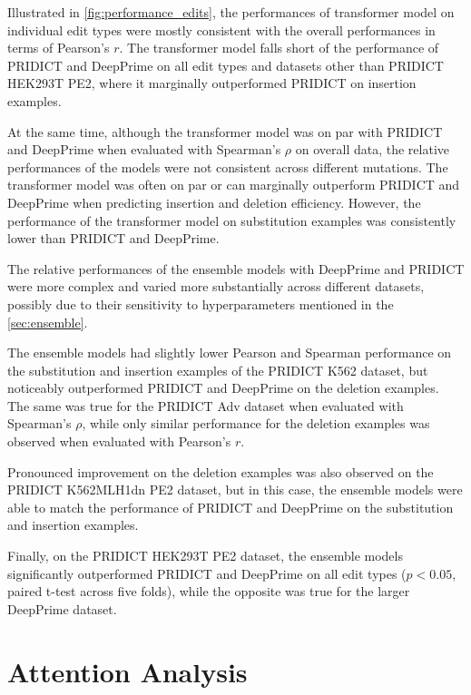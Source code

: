 Illustrated in \autoref{fig:performance_edits}, the performances of transformer model on individual edit types were mostly consistent with the overall performances in terms of Pearson's $r$. The transformer model falls short of the performance of PRIDICT and DeepPrime on all edit types and datasets other than PRIDICT HEK293T PE2, where it marginally outperformed PRIDICT on insertion examples.

At the same time, although the transformer model was on par with PRIDICT and DeepPrime when evaluated with Spearman's $\rho$ on overall data, the relative performances of the models were not consistent across different mutations. The transformer model was often on par or can marginally outperform PRIDICT and DeepPrime when predicting insertion and deletion efficiency. However, the performance of the transformer model on substitution examples was consistently lower than PRIDICT and DeepPrime.

The relative performances of the ensemble models with DeepPrime and PRIDICT were more complex and varied more substantially across different datasets, possibly due to their sensitivity to hyperparameters mentioned in the \autoref{sec:ensemble}. 

The ensemble models had slightly lower Pearson and Spearman performance on the substitution and insertion examples of the PRIDICT K562 dataset, but noticeably outperformed PRIDICT and DeepPrime on the deletion examples. The same was true for the PRIDICT Adv dataset when evaluated with Spearman's $\rho$, while only similar performance for the deletion examples was observed when evaluated with Pearson's $r$.

Pronounced improvement on the deletion examples was also observed on the PRIDICT K562MLH1dn PE2 dataset, but in this case, the ensemble models were able to match the performance of PRIDICT and DeepPrime on the substitution and insertion examples.

Finally, on the PRIDICT HEK293T PE2 dataset, the ensemble models significantly outperformed PRIDICT and DeepPrime on all edit types ($p<0.05$, paired t-test across five folds), while the opposite was true for the larger DeepPrime dataset.

\section{Attention Analysis}
\label{sec:attention_analysis}

